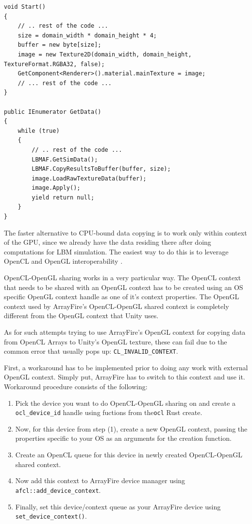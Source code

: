 \begin{lstlisting}[language=Csharp, caption=Rendering the simulation output to 2D texture by additionally copying the data., label=unity-render-by-copying]
void Start()
{
	// .. rest of the code ...
	size = domain_width * domain_height * 4;
	buffer = new byte[size];
	image = new Texture2D(domain_width, domain_height, TextureFormat.RGBA32, false);
	GetComponent<Renderer>().material.mainTexture = image;
	// ... rest of the code ...
}

public IEnumerator GetData()
{
	while (true)
	{
		// .. rest of the code ...
		LBMAF.GetSimData();
		LBMAF.CopyResultsToBuffer(buffer, size);
		image.LoadRawTextureData(buffer);
		image.Apply();
		yield return null;
	}
}
\end{lstlisting}

The faster alternative to CPU-bound data copying is to work only within context of the GPU, since we already have the data residing there after doing computations for LBM simulation. The easiest way to do this is to leverage OpenCL and OpenGL interoperability \citep{malcolmArrayFireGPUAcceleration2012a}.
 
OpenCL-OpenGL sharing works in a very particular way. The OpenCL context that needs to be shared with an OpenGL context has to be created using an OS specific OpenGL context handle as one of it's context properties. The OpenGL context used by ArrayFire's OpenCL-OpenGL shared context is completely different from the OpenGL context that Unity uses.

As for such attempts trying to use ArrayFire's OpenGL context for copying data from OpenCL Arrays to Unity's OpenGL texture, these can fail due to the common error that usually pops up: \texttt{CL\_INVALID\_CONTEXT}. 

First, a workaround has to be implemented prior to doing any work with external OpenGL context. Simply put, ArrayFire has to switch to this context and use it. Workaround procedure consists of the following:

\begin{enumerate}
	\item Pick the device you want to do OpenCL-OpenGL sharing on and create a \texttt{ocl_device_id} handle using fuctions from the\texttt{ocl} Rust create.
	\item Now, for this device from step (1), create a new OpenGL context, passing the properties specific to your OS as an arguments for the creation function.
	\item Create an OpenCL queue for this device in newly created OpenCL-OpenGL shared context.
	\item Now add this context to ArrayFire device manager using \texttt{afcl::add_device_context}.
	\item Finally, set this device/context queue as your ArrayFire device using \texttt{set_device_context()}.
\end{enumerate}

